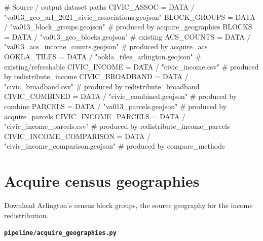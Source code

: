 \documentclass[
  letterpaper,
  DIV=11,
  numbers=noendperiod]{scrreprt}
\newenvironment{Shaded}{\begin{snugshade}}{\end{snugshade}}
\newcommand{\CommentTok}[1]{\textcolor[rgb]{0.37,0.37,0.37}{#1}}
\newcommand{\NormalTok}[1]{\textcolor[rgb]{0.00,0.23,0.31}{#1}}
\newcommand{\OperatorTok}[1]{\textcolor[rgb]{0.37,0.37,0.37}{#1}}
\newcommand{\StringTok}[1]{\textcolor[rgb]{0.13,0.47,0.30}{#1}}
\begin{document}
\begin{Shaded}
\begin{Highlighting}[]
\CommentTok{\# Source / output dataset paths}
\NormalTok{CIVIC\_ASSOC }\OperatorTok{=}\NormalTok{ DATA }\OperatorTok{/} \StringTok{"va013\_geo\_arl\_2021\_civic\_associations.geojson"}
\NormalTok{BLOCK\_GROUPS }\OperatorTok{=}\NormalTok{ DATA }\OperatorTok{/} \StringTok{"va013\_block\_groups.geojson"}          \CommentTok{\# produced by acquire\_geographies}
\NormalTok{BLOCKS }\OperatorTok{=}\NormalTok{ DATA }\OperatorTok{/} \StringTok{"va013\_geo\_blocks.geojson"}                  \CommentTok{\# existing}
\NormalTok{ACS\_COUNTS }\OperatorTok{=}\NormalTok{ DATA }\OperatorTok{/} \StringTok{"va013\_acs\_income\_counts.geojson"}       \CommentTok{\# produced by acquire\_acs}
\NormalTok{OOKLA\_TILES }\OperatorTok{=}\NormalTok{ DATA }\OperatorTok{/} \StringTok{"ookla\_tiles\_arlington.geojson"}        \CommentTok{\# existing/refreshable}
\NormalTok{CIVIC\_INCOME }\OperatorTok{=}\NormalTok{ DATA }\OperatorTok{/} \StringTok{"civic\_income.csv"}                    \CommentTok{\# produced by redistribute\_income}
\NormalTok{CIVIC\_BROADBAND }\OperatorTok{=}\NormalTok{ DATA }\OperatorTok{/} \StringTok{"civic\_broadband.csv"}             \CommentTok{\# produced by redistribute\_broadband}
\NormalTok{CIVIC\_COMBINED }\OperatorTok{=}\NormalTok{ DATA }\OperatorTok{/} \StringTok{"civic\_combined.geojson"}           \CommentTok{\# produced by combine}
\NormalTok{PARCELS }\OperatorTok{=}\NormalTok{ DATA }\OperatorTok{/} \StringTok{"va013\_parcels.geojson"}                   \CommentTok{\# produced by acquire\_parcels}
\NormalTok{CIVIC\_INCOME\_PARCELS }\OperatorTok{=}\NormalTok{ DATA }\OperatorTok{/} \StringTok{"civic\_income\_parcels.csv"}   \CommentTok{\# produced by redistribute\_income\_parcels}
\NormalTok{CIVIC\_INCOME\_COMPARISON }\OperatorTok{=}\NormalTok{ DATA }\OperatorTok{/} \StringTok{"civic\_income\_comparison.geojson"}  \CommentTok{\# produced by compare\_methods}
\end{Highlighting}
\end{Shaded}

\section{Acquire census geographies}\label{acquire-census-geographies}

Download Arlington's census block groups, the source geography for the
income redistribution.

\textbf{\texttt{pipeline/acquire\_geographies.py}}
\end{document}

